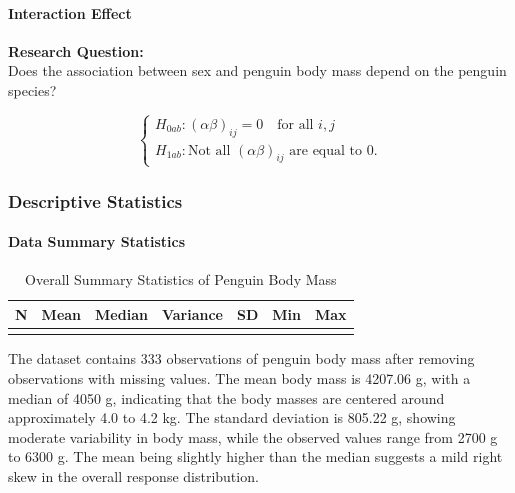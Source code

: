 \documentclass[
  11pt,
]{article}
\begin{document}
\paragraph{Interaction Effect}\label{interaction-effect}

\textbf{Research Question:}\\
Does the association between sex and penguin body mass depend on the
penguin species?

\[
\begin{cases}
H_{0ab}: (\alpha\beta)_{ij} = 0 \quad \text{for all } i,j\\
H_{1ab}: \text{Not all } (\alpha\beta)_{ij} \text{ are equal to } 0.
\end{cases}
\]

\subsubsection{Descriptive Statistics}\label{descriptive-statistics}

\paragraph{Data Summary Statistics}\label{data-summary-statistics}

\begin{table}[!h]
\centering
\caption{\label{tab:data-response-summary-anova}Overall Summary Statistics of Penguin Body Mass}
\centering
\begin{tabular}[t]{ccccccc}
\toprule
N & Mean & Median & Variance & SD & Min & Max\\
\midrule
\cellcolor{gray!10}{333} & \cellcolor{gray!10}{4207.06} & \cellcolor{gray!10}{4050} & \cellcolor{gray!10}{648372.5} & \cellcolor{gray!10}{805.22} & \cellcolor{gray!10}{2700} & \cellcolor{gray!10}{6300}\\
\bottomrule
\end{tabular}
\end{table}

The dataset contains 333 observations of penguin body mass after
removing observations with missing values. The mean body mass is 4207.06
g, with a median of 4050 g, indicating that the body masses are centered
around approximately 4.0 to 4.2 kg. The standard deviation is 805.22 g,
showing moderate variability in body mass, while the observed values
range from 2700 g to 6300 g. The mean being slightly higher than the
median suggests a mild right skew in the overall response distribution.
\end{document}

